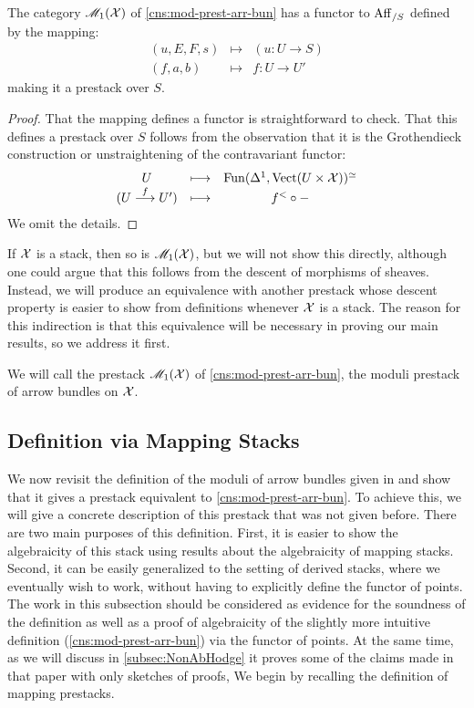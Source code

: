 \documentclass[11pt]{amsart}
\begin{document}
\begin{prop}
The category $\mathscr{M}_1(\mathcal{X})$ of \cref{cns:mod-prest-arr-bun} has a functor
to $\mathrm{Aff}_{/S}$ defined by the mapping:
\[\begin{array}{ccc}
(u, E, F, s) &\mapsto& (u : U \to S) \\
(f, a, b) &\mapsto& f : U \to U'
\end{array}\]
making it a prestack over $S$.
\end{prop}
\begin{proof}
That the mapping defines a functor is straightforward to check. That
this defines a prestack over $S$ follows from the observation that it
is the Grothendieck construction or unstraightening of the contravariant
functor:
\[\begin{array}{ccc}
U &\mapsto& \Fun(\Delta^1, \Vect(U \times \mcX))^\simeq \\
(U \to[f] U') &\mapsto& f^< \circ -
\end{array}\]
We omit the details.
\end{proof}

\begin{rmk}
If $\mathcal{X}$ is a stack, then so is $\mathscr{M}_1(\mathcal{X})$, but we will not show this
directly, although one could argue that this follows from the descent of
morphisms of sheaves.
Instead, we will produce an equivalence with another prestack
whose descent property is easier to show from definitions whenever $\mathcal{X}$ is
a stack. The reason for this
indirection is that this equivalence will be necessary in proving our
main results, so we address it first.
\end{rmk}

\begin{defn}
We will call the prestack $\mathscr{M}_1(\mathcal{X})$ of \cref{cns:mod-prest-arr-bun},
the moduli prestack of arrow bundles on $\mathcal{X}$.
\end{defn}

\subsection{Definition via Mapping Stacks}

We now revisit the definition of the moduli of arrow bundles given in
\cite{ModQuivBun} and show that it gives a prestack equivalent to
\cref{cns:mod-prest-arr-bun}. To achieve this, we will give a concrete
description of this prestack that was not given before. There are two
main purposes of this definition. First, it is easier to show the algebraicity
of this stack using results about the algebraicity of mapping stacks. Second,
it can be easily generalized to the setting
of derived stacks, where we eventually wish to work,
without having to explicitly define the functor of points.
The work in this subsection should be considered as evidence for the soundness
of the definition as well as a proof of algebraicity of the slightly more
intuitive definition (\cref{cns:mod-prest-arr-bun}) via the functor of points.
At the same time, as we will discuss in \cref{subsec:NonAbHodge}
it proves some of the claims made in that paper with only sketches of proofs,
We begin by recalling the definition of mapping prestacks.
\end{document}
